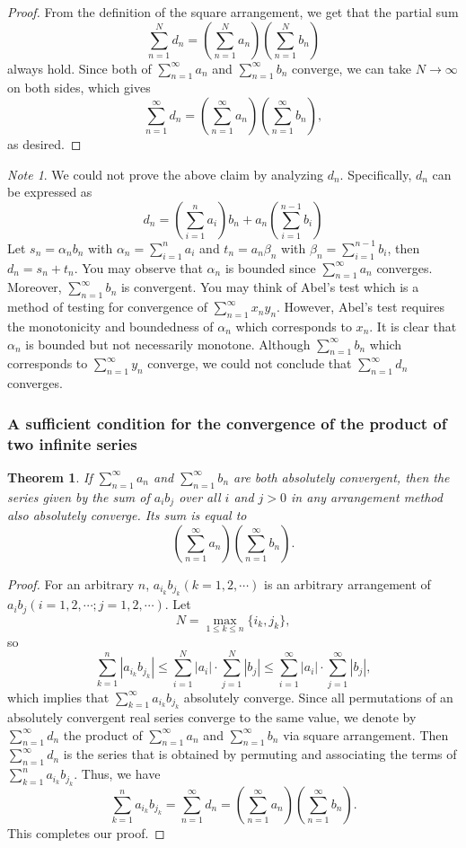 \documentclass{article}
\newtheorem{thm}{Theorem}[section]
\theoremstyle{remark}
\newtheorem*{note}{Note}
\begin{document}
\begin{proof}
From the definition of the square arrangement, we get that the partial sum
\[
\sum_{n=1}^{N}d_n=\left(\sum_{n=1}^{N}a_n\right)\left(\sum_{n=1}^{N}b_n\right)
\]
always hold. Since both of $\sum_{n=1}^{\infty}a_n$ and $\sum_{n=1}^{\infty}b_n$ converge, we can take $N\to \infty$ on both sides, which gives
\[
\sum_{n=1}^{\infty}d_n=\left(\sum_{n=1}^{\infty}a_n\right)\left(\sum_{n=1}^{\infty}b_n\right),
\]
as desired.

\end{proof}
\begin{note}
We could not prove the above claim by analyzing $d_n$. Specifically, $d_n$ can be expressed as
\[
d_n=\left(\sum_{i=1}^{n}a_i\right)b_n+a_n\left(\sum_{i=1}^{n-1}b_i\right)
\]
Let $s_n=\alpha_n b_n$ with $\alpha_n=\sum_{i=1}^{n}a_i$ and $t_n=a_n\beta_n$ with $\beta_n=\sum_{i=1}^{n-1}b_i$, then $d_n=s_n+t_n$. You may observe that $\alpha_n$ is bounded since $\sum_{n=1}^{\infty}a_n$ converges. Moreover, $\sum_{n=1}^{\infty}b_n$ is convergent. You may think of Abel's test which is a method of testing for convergence of $\sum_{n=1}^{\infty}x_ny_n$. However, Abel's test requires the monotonicity and boundedness of $\alpha_n$ which corresponds to $x_n$. It is clear that $\alpha_n$ is bounded but not necessarily monotone. Although $\sum_{n=1}^{\infty}b_n$ which corresponds to $\sum_{n=1}^{\infty}y_n$ converge, we could not conclude that $\sum_{n=1}^{\infty}d_n$ converges.
\end{note}

\subsubsection{A sufficient condition for the convergence of the product of two infinite series}
\begin{thm}
If $\sum_{n=1}^{\infty}a_n$ and $\sum_{n=1}^{\infty}b_n$ are both absolutely convergent, then the series given by the sum of $a_ib_j$ over all $i$ and $j>0$ in any arrangement method also absolutely converge. Its sum is equal to
\[
\left(\sum_{n=1}^{\infty}a_n\right)\left(\sum_{n=1}^{\infty}b_n\right).
\]
\end{thm}
\begin{proof}
For an arbitrary $n$, $a_{i_k}b_{j_k}(k=1,2,\cdots)$ is an arbitrary arrangement of $a_{i}b_{j}(i=1,2,\cdots;j=1,2,\cdots)$. Let
\[
N=\max_{1\le k\le n}\{i_k,j_k\},
\]
so 
\[
\sum_{k=1}^{n}|a_{i_k}b_{j_k}|\le \sum_{i=1}^{N}|a_{i}|\cdot\sum_{j=1}^{N}|b_{j}|\le  \sum_{i=1}^{\infty}|a_{i}|\cdot\sum_{j=1}^{\infty}|b_{j}|,
\]
which implies that $\sum_{k=1}^{\infty}a_{i_k}b_{j_k}$ absolutely converge. Since all permutations of an absolutely convergent real series converge to the same value, we denote by $\sum_{n=1}^{\infty}d_n$ the product of $\sum_{n=1}^{\infty}a_n$ and $\sum_{n=1}^{\infty}b_n$ via square arrangement. Then $\sum_{n=1}^{\infty}d_n$ is the series that is obtained by permuting and associating the terms of $\sum_{k=1}^{n}a_{i_k}b_{j_k}$. Thus, we have
\[
\sum_{k=1}^{n}a_{i_k}b_{j_k}=\sum_{n=1}^{\infty}d_n=\left(\sum_{n=1}^{\infty}a_n\right)\left(\sum_{n=1}^{\infty}b_n\right).
\]
This completes our proof.
\end{proof}
\end{document}
